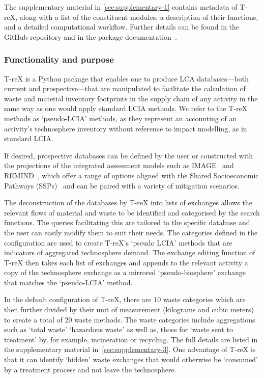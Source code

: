 \documentclass[a4paper,fleqn]{cas-dc}
\begin{document}
The supplementary material in  \autoref{sec:supplementary-1} contains metadata of
T-reX, along with a list of the constituent modules, a description of their
functions, and a detailed computational workflow. Further details can be found
in the GitHub repository and in the package documentation~\citep{mcdowall2024T-reXgithub, mcdowall2023T-reXdocs}.

\subsubsection{Functionality and purpose}

T-reX is a Python package that enables one to produce LCA databases---both
current and prospective---that are manipulated to facilitate the calculation of
waste and material inventory footprints in the supply chain of any activity in
the same way as one would apply standard LCIA methods. We refer to the T-reX
methods as `pseudo-LCIA' methods, as they represent an accounting of an
activity's technosphere inventory without reference to impact modelling, as in
standard LCIA.

If desired, prospective databases can be defined by the user or constructed
with the projections of the integrated assessment models such as
IMAGE~\citep{stehfest2014image} and REMIND~\citep{remind2020model}, which offer
a range of options aligned with the Shared Socioeconomic Pathways
(SSPs)~\citep{ssp2020ghg} and can be paired with a variety of mitigation
scenarios.

The deconstruction of the databases by T-reX into lists of exchanges allows the
relevant flows of material and waste to be identified and categorised by the
search functions. The queries facilitating this are tailored to the specific
database and the user can easily modify them to suit their needs. The
categories defined in the configuration are used to create T-reX's `pseudo
LCIA' methods that are indicators of aggregated technosphere demand. The
exchange editing function of T-reX then takes each list of exchanges and
appends to the relevant activity a copy of the technosphere exchange as a
mirrored `pseudo-biosphere' exchange that matches the `pseudo-LCIA' method.

In the default  configuration of T-reX, there are 10 waste categories which are
then further divided by their unit of measurement (kilograms and cubic meters)
to create a total of 20 waste methods. The waste categories include 
aggregations such as `total waste' `hazardous waste' as well as, those for
`waste sent to treatment' by, for example, incineration or recycling. The full
details are listed in the supplementary material  in~\autoref{sec:supplementary-3}. One advantage of T-reX is that it can identify `hidden' waste
exchanges that would otherwise be `consumed' by a treatment process and not
leave the technosphere. 
\end{document}
